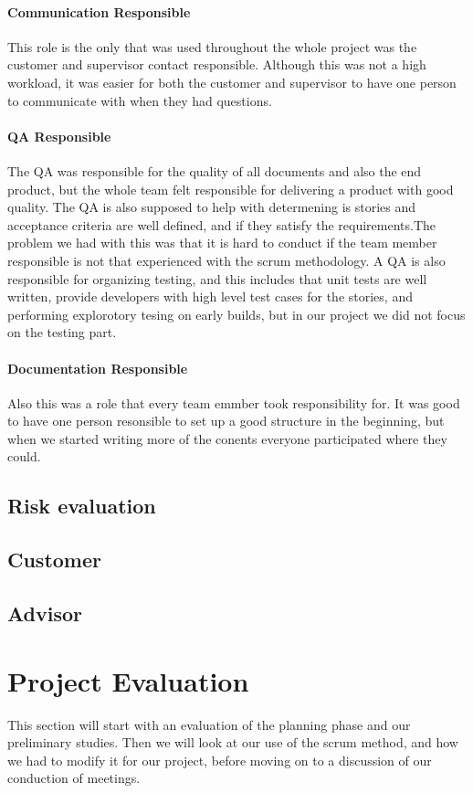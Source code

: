 \paragraph{Communication Responsible}
This role is the only that was used throughout the whole project was the customer and supervisor contact responsible. Although this was not a high workload, it was easier for both the customer and supervisor to have one person to communicate with when they had questions.  

\paragraph{QA Responsible}
The QA was responsible for the quality of all documents and also the end product, but the whole team felt responsible for delivering a product with good quality. The QA is also supposed to help with determening is stories and acceptance criteria are well defined, and if they satisfy the requirements.The problem we had with this was that it is hard to conduct if the team member responsible is not that experienced with the scrum methodology. A QA is also responsible for organizing testing, and this includes that unit tests are well written, provide developers with high level test cases for the stories, and performing explorotory tesing on early builds, but in our project we did not focus on the testing part. 

\paragraph{Documentation Responsible}
Also this was a role that every team emmber took responsibility for. It was good to have one person resonsible to set up a good structure in the beginning, but when we started writing more of the conents everyone participated where they could. 

\subsection{Risk evaluation}
\subsection{Customer} 
\subsection{Advisor}
\section{Project Evaluation}
This section will start with an evaluation of the planning phase and our preliminary studies.  
Then we will look at our use of the scrum method, and how we had to modify it for our project, before moving on to a discussion of our conduction of meetings. 
